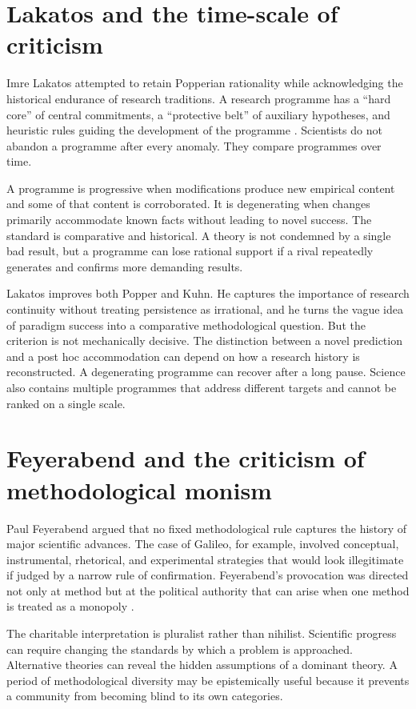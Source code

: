 \section{Lakatos and the time-scale of criticism}

Imre Lakatos attempted to retain Popperian rationality while acknowledging the
historical endurance of research traditions. A research programme has a
\enquote{hard core} of central commitments, a \enquote{protective belt} of
auxiliary hypotheses, and heuristic rules guiding the development of the
programme \citep{lakatos1970,lakatos1978}. Scientists do not abandon a
programme after every anomaly. They compare programmes over time.

A programme is progressive when modifications produce new empirical content
and some of that content is corroborated. It is degenerating when changes
primarily accommodate known facts without leading to novel success. The
standard is comparative and historical. A theory is not condemned by a single
bad result, but a programme can lose rational support if a rival repeatedly
generates and confirms more demanding results.

Lakatos improves both Popper and Kuhn. He captures the importance of research
continuity without treating persistence as irrational, and he turns the vague
idea of paradigm success into a comparative methodological question. But the
criterion is not mechanically decisive. The distinction between a novel
prediction and a post hoc accommodation can depend on how a research history
is reconstructed. A degenerating programme can recover after a long pause.
Science also contains multiple programmes that address different targets and
cannot be ranked on a single scale.

\section{Feyerabend and the criticism of methodological monism}

Paul Feyerabend argued that no fixed methodological rule captures the history
of major scientific advances. The case of Galileo, for example, involved
conceptual, instrumental, rhetorical, and experimental strategies that would
look illegitimate if judged by a narrow rule of confirmation. Feyerabend's
provocation was directed not only at method but at the political authority that
can arise when one method is treated as a monopoly \citep{feyerabend1975}.

The charitable interpretation is pluralist rather than nihilist. Scientific
progress can require changing the standards by which a problem is approached.
Alternative theories can reveal the hidden assumptions of a dominant theory.
A period of methodological diversity may be epistemically useful because it
prevents a community from becoming blind to its own categories.

